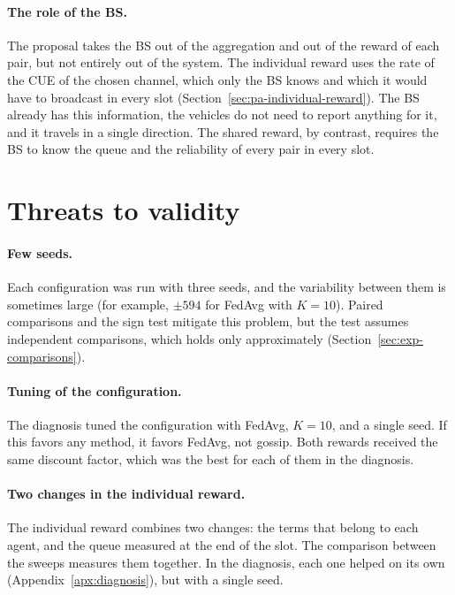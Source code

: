 \paragraph{The role of the BS.} The proposal takes the \ac{BS} out of the aggregation and out of the reward of
each pair, but not entirely out of the system. The individual reward uses the rate of the \ac{CUE} of the
chosen channel, which only the \ac{BS} knows and which it would have to broadcast in every slot
(Section~\ref{sec:pa-individual-reward}). The \ac{BS} already has this information, the vehicles do not need
to report anything for it, and it travels in a single direction. The shared reward, by contrast, requires the
\ac{BS} to know the queue and the reliability of every pair in every slot.

\section{Threats to validity}
\label{sec:res-threats}

\paragraph{Few seeds.} Each configuration was run with three seeds, and the variability between them is
sometimes large (for example, $\pm 594$ for \ac{FedAvg} with $K = 10$). Paired comparisons and the sign test
mitigate this problem, but the test assumes independent comparisons, which holds only approximately
(Section~\ref{sec:exp-comparisons}).

\paragraph{Tuning of the configuration.} The diagnosis tuned the configuration with \ac{FedAvg}, $K = 10$,
and a single seed. If this favors any method, it favors \ac{FedAvg}, not gossip. Both rewards received the
same discount factor, which was the best for each of them in the diagnosis.

\paragraph{Two changes in the individual reward.} The individual reward combines two changes: the terms that
belong to each agent, and the queue measured at the end of the slot. The comparison between the sweeps
measures them together. In the diagnosis, each one helped on its own (Appendix~\ref{apx:diagnosis}), but
with a single seed.

